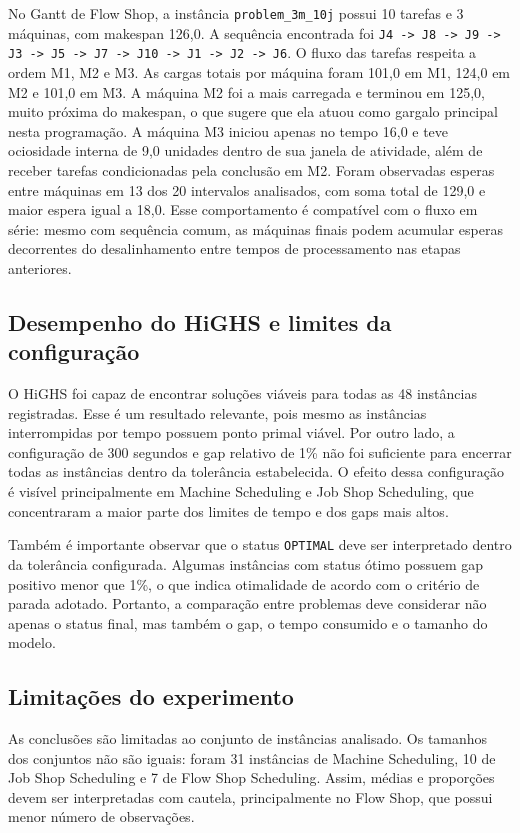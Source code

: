 No Gantt de Flow Shop, a instância \texttt{problem\_3m\_10j} possui 10 tarefas e
3 máquinas, com makespan 126,0. A sequência encontrada foi
\texttt{J4 -> J8 -> J9 -> J3 -> J5 -> J7 -> J10 -> J1 -> J2 -> J6}. O fluxo das
tarefas respeita a ordem M1, M2 e M3. As cargas totais por máquina foram 101,0
em M1, 124,0 em M2 e 101,0 em M3. A máquina M2 foi a mais carregada e terminou
em 125,0, muito próxima do makespan, o que sugere que ela atuou como gargalo
principal nesta programação. A máquina M3 iniciou apenas no tempo 16,0 e teve
ociosidade interna de 9,0 unidades dentro de sua janela de atividade, além de
receber tarefas condicionadas pela conclusão em M2. Foram observadas esperas
entre máquinas em 13 dos 20 intervalos analisados, com soma total de 129,0 e
maior espera igual a 18,0. Esse comportamento é compatível com o fluxo em série:
mesmo com sequência comum, as máquinas finais podem acumular esperas decorrentes
do desalinhamento entre tempos de processamento nas etapas anteriores.

\subsection{Desempenho do HiGHS e limites da configuração}

O HiGHS foi capaz de encontrar soluções viáveis para todas as 48 instâncias
registradas. Esse é um resultado relevante, pois mesmo as instâncias
interrompidas por tempo possuem ponto primal viável. Por outro lado, a
configuração de 300 segundos e gap relativo de 1\% não foi suficiente para
encerrar todas as instâncias dentro da tolerância estabelecida. O efeito dessa
configuração é visível principalmente em Machine Scheduling e Job Shop
Scheduling, que concentraram a maior parte dos limites de tempo e dos gaps mais
altos.

Também é importante observar que o status \texttt{OPTIMAL} deve ser interpretado
dentro da tolerância configurada. Algumas instâncias com status ótimo possuem
gap positivo menor que 1\%, o que indica otimalidade de acordo com o critério de
parada adotado. Portanto, a comparação entre problemas deve considerar não
apenas o status final, mas também o gap, o tempo consumido e o tamanho do modelo.

\subsection{Limitações do experimento}

As conclusões são limitadas ao conjunto de instâncias analisado. Os tamanhos dos
conjuntos não são iguais: foram 31 instâncias de Machine Scheduling, 10 de Job
Shop Scheduling e 7 de Flow Shop Scheduling. Assim, médias e proporções devem
ser interpretadas com cautela, principalmente no Flow Shop, que possui menor
número de observações.

